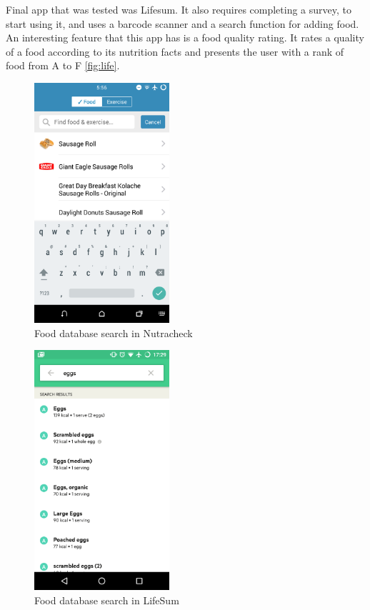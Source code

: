 Final app that was tested was Lifesum. It also requires completing a survey, to start using it, and uses a barcode scanner and a search function for adding food. An interesting feature that this app has is a food quality rating. It rates a quality of a food according to its nutrition facts and presents the user with a rank of food from A to F \autoref{fig:life}.

 \begin{figure}[ht]
\centering
\includegraphics[width=5cm]{Figures/2/eat.png}
\caption{Food database search in Nutracheck}
\label{fig:eat}
\end{figure}

\begin{figure}[ht]
\centering
\includegraphics[width=5cm]{Figures/2/mm.png}
\caption{Food database search in LifeSum}
\label{fig:life}
\end{figure}

